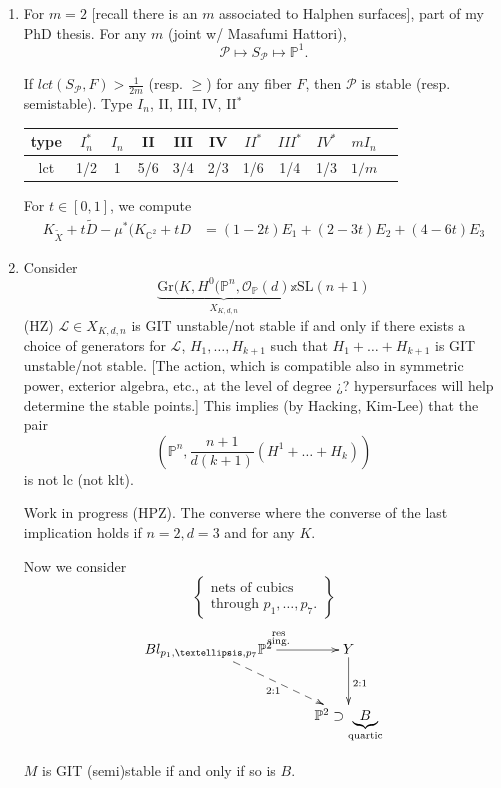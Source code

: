 \begin{enumerate}
\item For $m=2$ [recall there is an $m$
associated to Halphen surfaces],
part of my PhD thesis.
For any $m$ (joint w/ Masafumi Hattori),
$$
\mathcal{P}
\mapsto  S_{\mathcal{P}}
\mapsto \mathbb{P}^1.
$$
\begin{theorem}
\label{theorem-duplicate-2}
If $lct(S_{\mathcal{P}},F) > \frac{1}{2m}$
(resp. $\geq$)
for any fiber $F$,
then $\mathcal{P}$ is
stable (resp. semistable).
Type
$I_n$, II, III, IV, II$^*$
\end{theorem}

\begin{tabular}{c|c c c c c c c c c c}
type & $I^*_n$&$I_n$
&II&III&IV&$II^*$&$III^*$&$IV^*$&$m I_n$\\
\hline
lct&1/2&1&5/6&3/4&2/3&1/6&1/4&1/3&$1/m$
\end{tabular}

\noindent
For $t \in [0,1]$,
we compute
$$
\begin{aligned}
K_{\tilde{X}}+t\tilde{D}-\mu^*
(K_{\mathbb{C}^2}+tD
&=(1-2t)E_1+(2-3t)E_2+(4-6t)E_3
\end{aligned}
$$

\item Consider
$$
\underbrace{\text{Gr}(K,H^0(\mathbb{P}^n,
\mathcal{O}_{\mathbb{P}}(d)}_{
X_{K,d,n}}
\mathbb{x}\text{SL}(n+1)
$$
(HZ) $\mathcal{L} \in X_{K,d,n}$
is GIT unstable/not stable if and only if
there exists a choice of generators for
$\mathcal{L}$, $H_1,…,H_{k+1}$
such that
$H_1+…+H_{k+1}$ is GIT unstable/not stable.
[The action, which is compatible
also in symmetric power, exterior algebra,
etc.,
at the level of degree ¿? hypersurfaces will
help
determine the stable points.]
This implies (by Hacking, Kim-Lee) that the
pair
$$
\left(
\mathbb{P}^n,
\frac{n+1}{d(k+1)}(H^1+…+H_k)\right)
$$
is not lc (not klt).

Work in progress (HPZ).
The converse where the converse of the last
implication
holds if $n=2, d=3$
and for any $K$.

\medskip\noindent
Now we consider
$$
\left\{
\substack{\text{nets of cubics} \\
\text{through $p_1,…,p_7$.} }\right\}
$$
$$
\xymatrix{
Bl_{p_1,…,p_7}\mathbb{P}^2
\ar[r]^{\substack{\text{res} \\\text{sing.}
}}
\ar@{-->}[rd]_{2:1}
& Y \ar[d]^{2:1}\\
&\mathbb{P}^2 \supset
\underbrace{B}_{\text{quartic}}
}
$$

$M$ is GIT (semi)stable if and only if so is
$B$.
\end{enumerate}

